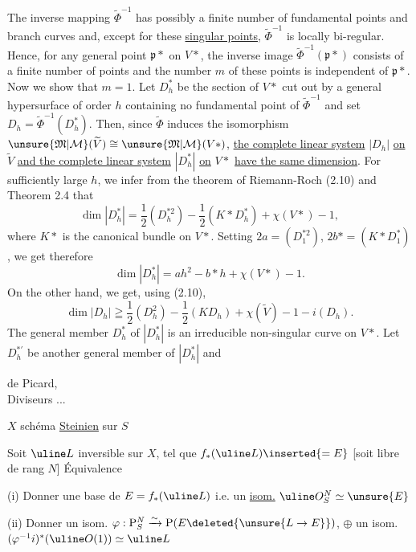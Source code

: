The inverse mapping $\widetilde\Phi^{-1}$ has possibly a finite number of fundamental points and branch curves and, except for these \uline{singular points}, $\widetilde\Phi^{-1}$ is locally bi-regular. Hence, for any general point $\mathfrak p*$ on $V*$, the inverse image $\widetilde\Phi^{-1}(\mathfrak p*)$ consists of a finite number of points and the number $m$ of these points is independent of $\mathfrak p*$. Now we show that $m=1$. Let $D_h^*$ be the section of $V*$ cut out by a general hypersurface of order $h$ containing no fundamental point of $\widetilde\Phi^{-1}$ and set $D_h=\widetilde\Phi^{-1}(D_h^*)$. Then, since $\widetilde\Phi$ induces the isomorphism $\unsure{\mathfrak M|\mathcal M}(\widetilde V)\cong\unsure{\mathfrak M|\mathcal M}(V*)$, \uline{the complete linear system} $|D_h|$ \uline{on} $\widetilde V$ \uline{and the complete linear system} $|D_h^*|$ \uline{on} $V*$ \uline{have the same dimension}. For sufficiently large $h$, we infer from the theorem of Riemann-Roch (2.10) and Theorem 2.4 that
\[
\dim|D_h^*|=\frac12(D_h^{*2})-\frac12(K*D_h^*)+\chi(V*)-1,
\]
where $K*$ is the canonical bundle on $V*$. Setting $2a=(D_1^{*2})$, $2b*=(K*D_1^*)$, we get therefore
\[
\dim|D_h^*|=ah^2-b*h+\chi(V*)-1.
\]
On the other hand, we get, using (2.10),
\[
\dim|D_h|\geqq\frac12(D_h^2)-\frac12(KD_h)+\chi(\widetilde V)-1-i(D_h).
\]
The general member $D_h^*$ of $|D_h^*|$ is an irreducible non-singular curve on $V*$. Let $D_h^{*\prime}$ be another general member of $|D_h^*|$ and

\begin{flushright}
 de Picard,\\
Diviseurs ...
\end{flushright}

$X$ schéma \uline{Steinien} sur $S$

 Soit $\uline L$ inversible sur $X$, tel que $f_*(\uline L)\inserted{=E}$ [soit libre de rang $N$]
Équivalence

(i) Donner une base de $E=f_*(\uline L)$ i.e. un \uline{isom.} $\uline O_S^N\simeq\unsure{E}$

(ii) Donner un isom. $\varphi:\mathrm P_S^N\xrightarrow{\sim}\mathrm P(E\deleted{\unsure{L\to E}})$, $\oplus$ un isom.
$(\varphi^{-1}i)^*(\uline O(1))\simeq\uline L$

